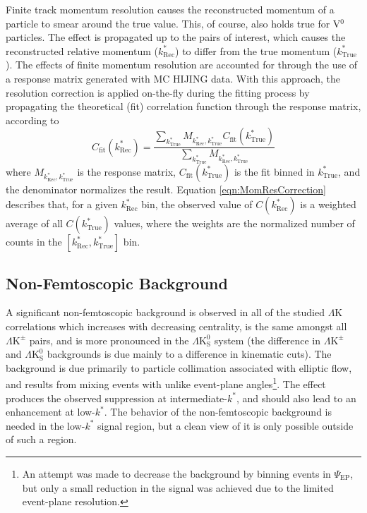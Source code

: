 \documentclass[ALICE,manyauthors]{cernphprep}
\newcommand{\kstar}{$k^{*}$\xspace}
\newcommand{\ktrue}{$k^{*}_{\mathrm{True}}$\xspace}
\newcommand{\krec}{$k^{*}_{\mathrm{Rec}}$\xspace}
\newcommand{\LamK}{$\Lambda$K\xspace}
\newcommand{\LamKpm}{$\Lambda\mathrm{K^{\pm}}$\xspace}
\newcommand{\LamKs}{$\Lambda\mathrm{K^{0}_{S}}$\xspace}
\newcommand{\Vz}{V$^{0}$\xspace}
\begin{document}
Finite track momentum resolution causes the reconstructed momentum of a particle to smear around the true value.
This, of course, also holds true for \Vz particles.
The effect is propagated up to the pairs of interest, which causes the reconstructed relative momentum (\krec) to differ from the true momentum (\ktrue).
The effects of finite momentum resolution are accounted for through the use of a response matrix generated with MC HIJING data.
With this approach, the resolution correction is applied on-the-fly during the fitting process by propagating the theoretical (fit) correlation function through the response matrix, according to
\begin{equation}
  C_{\mathrm{fit}}(k^{*}_{\mathrm{Rec}}) = \dfrac{\sum\limits_{k^{*}_{\mathrm{True}}}M_{k^{*}_{\mathrm{Rec}},k^{*}_{\mathrm{True}}}C_{\mathrm{fit}}(k^{*}_{\mathrm{True}})}{\sum\limits_{k^{*}_{\mathrm{True}}}M_{k^{*}_{\mathrm{Rec}},k^{*}_{\mathrm{True}}}}
\label{eqn:MomResCorrection}
\end{equation}
where $M_{k^{*}_{\mathrm{Rec}},k^{*}_{\mathrm{True}}}$ is the response matrix, $C_{\mathrm{fit}}(k^{*}_{\mathrm{True}})$ is the fit binned in \ktrue, and the denominator normalizes the result.
Equation \ref{eqn:MomResCorrection} describes that, for a given \krec bin, the observed value of $C(k^{*}_{\mathrm{Rec}})$ is a weighted average of all $C(k^{*}_{\mathrm{True}})$ values, where the weights are the normalized number of counts in the \mbox{$[k^{*}_{\mathrm{Rec}}, k^{*}_{\mathrm{True}}]$} bin.


\subsection{Non-Femtoscopic Background}
\label{NonFlatBackground}

A significant non-femtoscopic background is observed in all of the studied \LamK correlations which increases with decreasing centrality, is the same amongst all \LamKpm pairs, and is more pronounced in the \LamKs system (the difference in \LamKpm and \LamKs backgrounds is due mainly to a difference in kinematic cuts).  
The background is due primarily to particle collimation associated with elliptic flow, and results from mixing events with unlike event-plane angles\footnote[1]
{
An attempt was made to decrease the background by binning events in $\Psi_{\mathrm{EP}}$, but only a small reduction in the signal was achieved due to the limited event-plane resolution.
}\cite{Kisiel:2017}.
The effect produces {\color{red}{to}} the observed suppression at intermediate-\kstar, and should also lead to an enhancement at low-\kstar.
The behavior of the non-femtoscopic background is needed in the low-\kstar signal region, but a clean view of it is only possible outside of such a region.
\end{document}
